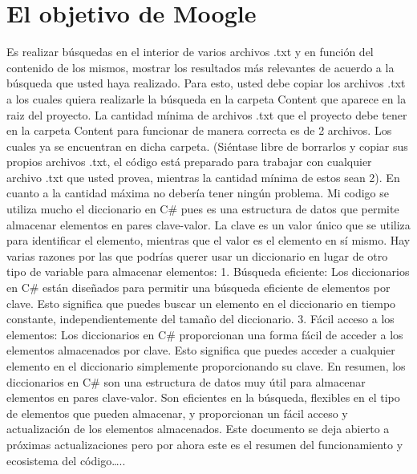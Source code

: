 \documentclass[12]{article}
\begin{document}
\section{El objetivo de Moogle\!} Es realizar búsquedas en el interior de varios archivos .txt y en función 
del contenido de los mismos, mostrar los resultados más relevantes de acuerdo a la búsqueda 
que usted haya realizado. Para esto, usted debe copiar los archivos .txt a los cuales quiera 
realizarle la búsqueda en la carpeta Content que aparece en la raiz del proyecto. La cantidad 
mínima de archivos .txt que el proyecto debe tener en la carpeta Content para funcionar de 
manera correcta es de 2 archivos. Los cuales ya se encuentran en dicha carpeta. (Siéntase libre 
de borrarlos y copiar sus propios archivos .txt, el código está preparado para trabajar con 
cualquier archivo .txt que usted provea, mientras la cantidad mínima de estos sean 2). En 
cuanto a la cantidad máxima no debería tener ningún problema.
Mi codigo se utiliza mucho el diccionario en C\# pues es una estructura de datos que permite 
almacenar elementos en pares clave-valor. La clave es un valor único que se utiliza para 
identificar el elemento, mientras que el valor es el elemento en sí mismo. 
Hay varias razones por las que podrías querer usar un diccionario en lugar de otro tipo de 
variable para almacenar elementos:
1. Búsqueda eficiente: Los diccionarios en C\# están diseñados para permitir una búsqueda 
eficiente de elementos por clave. Esto significa que puedes buscar un elemento en el 
diccionario en tiempo constante, independientemente del tamaño del diccionario.
3. Fácil acceso a los elementos: Los diccionarios en C\# proporcionan una forma fácil de acceder 
a los elementos almacenados por clave. Esto significa que puedes acceder a cualquier 
elemento en el diccionario simplemente proporcionando su clave.
En resumen, los diccionarios en C\# son una estructura de datos muy útil para almacenar 
elementos en pares clave-valor. Son eficientes en la búsqueda, flexibles en el tipo de 
elementos que pueden almacenar, y proporcionan un fácil acceso y actualización de los 
elementos almacenados.
Este documento se deja abierto a próximas actualizaciones pero por ahora este es el resumen 
del funcionamiento y ecosistema del código…..
\end{document}
